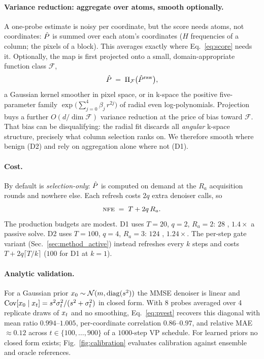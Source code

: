 \paragraph{Variance reduction: aggregate over atoms, smooth optionally.}
A one-probe estimate is noisy per coordinate, but the score needs atoms,
not coordinates: $\hat{P}$ is summed over each atom's coordinates ($H$
frequencies of a column; the pixels of a block). This averages exactly
where Eq.~\ref{eq:score} needs it. Optionally, the map is first
projected onto a small, domain-appropriate function class $\mathcal{F}$,
\begin{equation}
  \hat{P} \;=\; \Pi_{\mathcal{F}}\big(\hat{P}^{\mathrm{raw}}\big),
  \label{eq:smooth}
\end{equation}
a Gaussian kernel smoother in pixel space, or in k-space the positive
five-parameter family $\exp\!\big(\sum_{j=0}^{4} \beta_j\, r^{2j}\big)$ of
radial even log-polynomials. Projection buys a further
$O(d/\dim\mathcal{F})$ variance reduction at the price of bias toward
$\mathcal{F}$. That bias can be disqualifying: the radial fit discards
all \emph{angular} k-space structure, precisely what column selection
ranks on. We therefore smooth where benign (D2) and rely on aggregation
alone where not (D1).

\paragraph{Cost.}
By default \pvas{} is \emph{selection-only}: $\hat{P}$ is computed on demand
at the $R_a$ acquisition rounds and nowhere else. Each refresh costs
$2q$ extra denoiser calls, so
\begin{equation}
  \textsc{nfe} \;=\; T + 2q\,R_a .
  \label{eq:nfe}
\end{equation}
The production budgets are modest. D1 uses $T{=}20$, $q{=}2$, $R_a{=}2$:
$28$ \nfe, $1.4\times$ a passive solve. D2 uses $T{=}100$, $q{=}4$,
$R_a{=}3$: $124$ \nfe, $1.24\times$. The per-step gate variant
(Sec.~\ref{sec:method_active}) instead refreshes every $k$ steps and
costs $T + 2q\lceil T/k \rceil$ ($100$ \nfe{} for D1 at $k{=}1$).

\paragraph{Analytic validation.}
For a Gaussian prior $x_0 \sim \mathcal{N}(m, \operatorname{diag}(s^2))$ the
MMSE denoiser is linear and $\operatorname{Cov}[x_0\mid x_t] =
s^2\sigma_t^2/(s^2+\sigma_t^2)$ in closed form. With 8 probes averaged over 4
replicate draws of $x_t$ and no smoothing, Eq.~\ref{eq:pvest} recovers
this diagonal with mean ratio $0.994$--$1.005$, per-coordinate correlation
$0.86$--$0.97$, and relative MAE ${\approx}0.12$ across
$t \in \{100,\dots,900\}$ of a $1000$-step VP schedule\RLOCAL{}. For
learned priors no closed form exists; Fig.~\ref{fig:calibration}
evaluates calibration against ensemble and oracle references.

